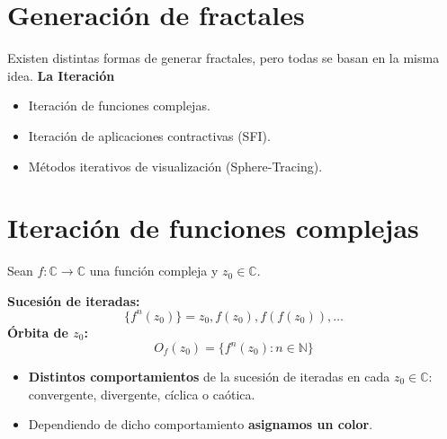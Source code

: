 \section{Generación de fractales}

\begin{frame}{\insertsectionhead}

{\Large Existen distintas formas de generar fractales, pero todas se basan en la misma idea.}
\pause
\vfill
\centering
{\LARGE \textbf{La Iteración}}
\vspace{\fill}
\pause
\begin{itemize}
    \item {\Large Iteración de funciones complejas.}
    \item {\Large Iteración de aplicaciones contractivas (SFI).}
    \item {\Large Métodos iterativos de visualización (Sphere-Tracing).}
\end{itemize}
    
\end{frame}

\section{Iteración de funciones complejas}

\begin{frame}{\insertsectionhead}
    
{\large
Sean $f:\mathbb C\longrightarrow \mathbb C$ una función compleja y $z_0\in\mathbb C$. 
\pause

\textbf{Sucesión de iteradas:}
$$
\{f^n(z_0)\} = z_0, f(z_0), f(f(z_0)), \dots
$$
\pause
\textbf{Órbita de $z_0$:}
$$
O_f(z_0)=\{f^n(z_0) : n\in\mathbb N\}
$$
\pause
\begin{itemize}
    \item \textbf{Distintos comportamientos} de la sucesión de iteradas en cada $z_0\in\mathbb C$: convergente, divergente, cíclica o caótica.
    \item Dependiendo de dicho comportamiento \textbf{asignamos un color}.
\end{itemize}

}
\end{frame}

